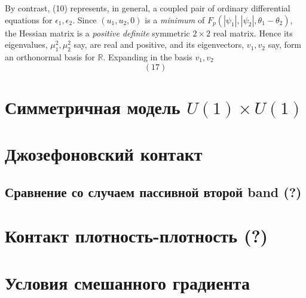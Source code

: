 By contrast, (10) represents, in general, a coupled pair of ordinary 
differential equations for \( \epsilon_1, \epsilon_2 \). Since 
\( (u_1, u_2, 0 ) \) is a \textit{minimum} of 
\( F_p(|\psi_1|, |\psi_2|, \theta_1 - \theta_2) \), the Hessian matrix is a 
\textit{positive definite} symmetric \( 2\times2 \) real matrix. Hence its 
eigenvalues, \( \mu_1^2, \mu_2^2\) say, are real and positive, and its 
eigenvectors, \( v_1, v_2 \) say, form an orthonormal basis for 
\( \mathbb{R} \). Expanding in the basis \( v_1, v_2 \)
\begin{equation}
(17)
\end{equation}

\section{Симметричная модель \texorpdfstring{$ U(1) \times U(1) $}
  {U(1) x U(1)}}
\label{sec:3-1}

\section{Джозефоновский контакт}
\label{sec:3-2}

\subsection{Сравнение со случаем пассивной второй band (?)}
\label{subsec:3-2-1}

\section{Контакт плотность-плотность (?)}
\label{sec:3-3}

\section{Условия смешанного градиента}
\label{sec:3-4}
